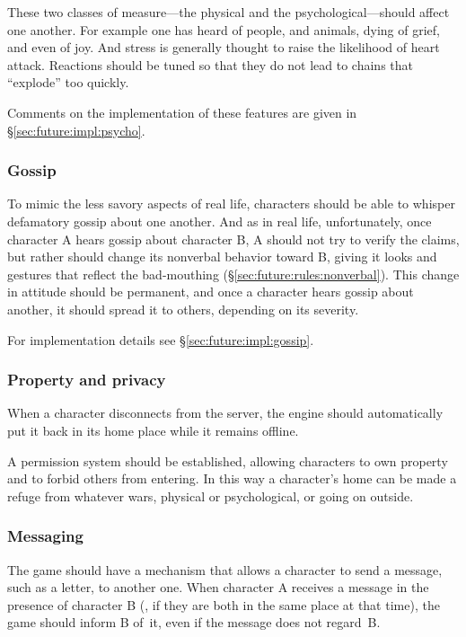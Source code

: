 These two classes of measure---the physical and the psychological---should
affect one another.
For example one has heard of people, and animals, dying of grief, and even
of joy.
And stress is generally thought to raise the likelihood of heart attack.
Reactions should be tuned so that they do not lead to chains that ``explode''
too quickly.

Comments on the implementation of these features are given in
\S\ref{sec:future:impl:psycho}.

\subsubsection{Gossip}

To mimic the less savory aspects of real life, characters should be able to
whisper defamatory gossip about one another.
And as in real life, unfortunately, once character A hears gossip about
character B, A should not try to verify the claims, but rather should change
its nonverbal behavior toward B\@, giving it looks and gestures that
reflect the bad-mouthing (\S\ref{sec:future:rules:nonverbal}).
This change in attitude should be permanent, and once a character hears gossip
about another, it should spread it to others, depending on its severity.

For implementation details see \S\ref{sec:future:impl:gossip}.

\subsubsection{Property and privacy}

When a character disconnects from the server, the engine should automatically
put it back in its home place while it remains offline.

A permission system should be established, allowing characters to own
property and to forbid others from entering.
In this way a character's home can be made a refuge from whatever wars,
physical or psychological, or going on outside.

\subsubsection{Messaging}

The game should have a mechanism that allows a character to send a message,
such as a letter, to another one.
When character A receives a message in the presence of character B
(\ie, if they are both in the same place at that time), the game
should inform B of~it, even if the message does not regard~B\@.

